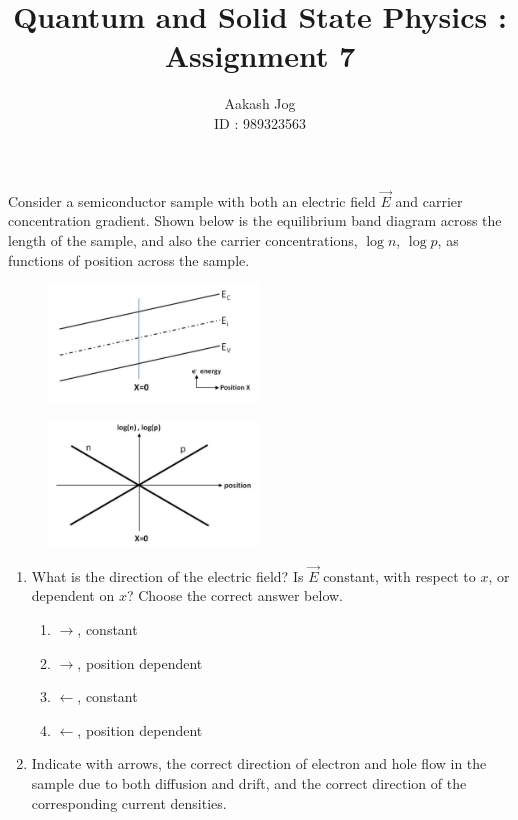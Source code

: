 \documentclass[fleqn, a4paper, 11pt, oneside]{amsart}
\title{Quantum and Solid State Physics : Assignment 7}
\author
{
	Aakash Jog\\
	ID : 989323563
}
\date{\formatdate{3}{12}{2015}}
\theoremstyle{definition}
\theoremstyle{theorem}
\begin{document}

\maketitle

\begin{question}
	Consider a semiconductor sample with both an electric field $\overrightarrow{E}$ and carrier concentration gradient.
	Shown below is the equilibrium band diagram across the length of the sample, and also the carrier concentrations, $\log n$, $\log p$, as functions of position across the sample.
	\begin{figure}[H]
		\centering
		\includegraphics[width = 0.5\textwidth]{fig1.png}
	\end{figure}
	\begin{figure}[H]
		\centering
		\includegraphics[width = 0.5\textwidth]{fig2.png}
	\end{figure}
	\begin{enumerate}
		\item
			What is the direction of the electric field?
			Is $\overrightarrow{E}$ constant, with respect to $x$, or dependent on $x$?
			Choose the correct answer below.
			\begin{enumerate}
				\item $\rightarrow$, constant
				\item $\rightarrow$, position dependent
				\item $\leftarrow$, constant
				\item $\leftarrow$, position dependent
			\end{enumerate}
		\item
			Indicate with arrows, the correct direction of electron and hole flow in the sample due to both diffusion and drift, and the correct direction of the corresponding current densities.
	\end{enumerate}
\end{question}
\end{document}
